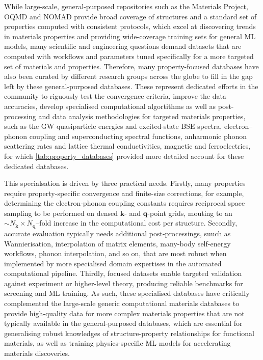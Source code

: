 While large-scale, general-purposed repositories such as the Materials Project, OQMD and NOMAD provide broad coverage of structures and a standard set of properties computed with consistent protocols, which excel at discovering trends in materials properties and providing wide-coverage training sets for  general ML models, many scientific and engineering questions demand datasets that are computed with workflows and parameters tuned specifically for a more targeted set of materials and properties. Therefore, many property-focused databases have also been curated by different research groups across the globe to fill in the gap left by these general-purposed databases. These represent dedicated efforts in the community to riguously test the convergence criteria, improve the data accuracies, develop specialised computational algortithms as well as post-processing and data analysis methodologies for targeted materials properties, such as the GW quasiparticle energies and excited-state BSE spectra,  electron--phonon coupling and superconducting spectral functions, anharmonic phonon scattering rates and lattice thermal conductivities, magnetic and ferroelectrics, for which \cref{tab:property_databases} provided more detailed account for these dedicated databases.

This specialsation is driven by three practical needs. Firstly, many properties require property-specific convergence and finite-size corrections, for example, determining the electron-phonon coupling constants requires reciprocal space sampling to be performed on densed $\bm{k}$- and $\bm{q}$-point grids, mouting to an $\sim N_{\bm{k}}\times N_{\bm{q}}$--fold increase in the computational cost per structure. Secondly, accurate evaluation typically needs additional post-processings, suuch as Wannierisation, interpolation of matrix elements, many-body self-energy workflows, phonon interpolation, and so on, that are most robust when implemented by more specialised domain expertises in the automated computational pipeline. Thirdly, focused datasets enable targeted validation against experiment or higher-level theory, producing reliable benchmarks for screening and ML training. As such, these specialised databases have critically complemented the large-scale generic computational materials databases to provide high-quality data for more complex materials properties that are not typically available in the general-purposed databases, which are essential for generalising robust knowledges of structure-property relationships for functional materials, as well as training physics-specific ML models for accelerating materials discoveries. 
  


